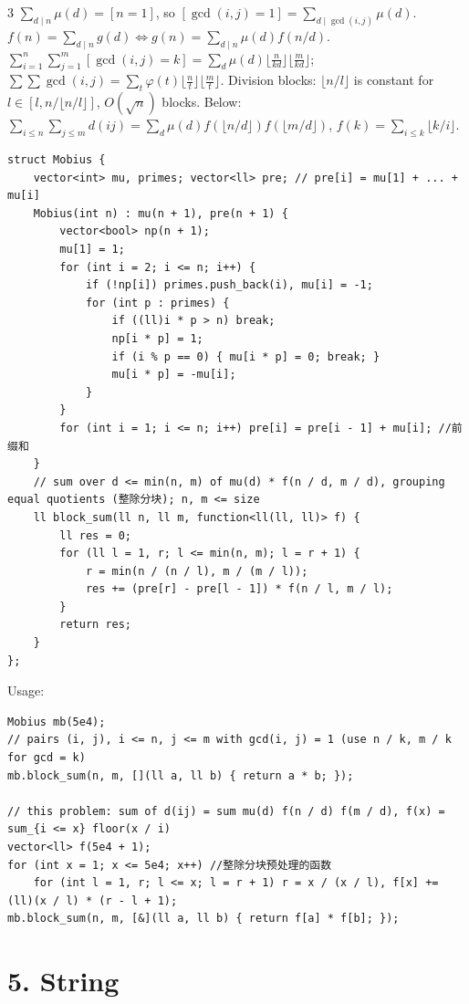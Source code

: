 \documentclass[8pt]{extarticle}
\begin{document}
\begin{multicols*}{3}
$\sum_{d \mid n}\mu(d) = [n = 1]$, so $[\gcd(i, j) = 1] = \sum_{d \mid \gcd(i,j)} \mu(d)$.
$f(n) = \sum_{d \mid n} g(d) \iff g(n) = \sum_{d \mid n} \mu(d) f(n/d)$.
$\sum_{i=1}^{n}\sum_{j=1}^{m}[\gcd(i,j) = k] = \sum_{d} \mu(d) \lfloor \frac{n}{kd} \rfloor \lfloor \frac{m}{kd} \rfloor$; $\sum\sum \gcd(i,j) = \sum_t \varphi(t) \lfloor \frac nt \rfloor \lfloor \frac mt \rfloor$.
Division blocks: $\lfloor n/l \rfloor$ is constant for $l \in [l, n / \lfloor n/l \rfloor]$, $O(\sqrt n)$ blocks. Below: $\sum_{i \le n}\sum_{j \le m} d(ij) = \sum_d \mu(d) f(\lfloor n/d \rfloor) f(\lfloor m/d \rfloor)$, $f(k) = \sum_{i \le k} \lfloor k/i \rfloor$.

\begin{lstlisting}
struct Mobius {
    vector<int> mu, primes; vector<ll> pre; // pre[i] = mu[1] + ... + mu[i]
    Mobius(int n) : mu(n + 1), pre(n + 1) {
        vector<bool> np(n + 1);
        mu[1] = 1;
        for (int i = 2; i <= n; i++) {
            if (!np[i]) primes.push_back(i), mu[i] = -1;
            for (int p : primes) {
                if ((ll)i * p > n) break;
                np[i * p] = 1;
                if (i % p == 0) { mu[i * p] = 0; break; }
                mu[i * p] = -mu[i];
            }
        }
        for (int i = 1; i <= n; i++) pre[i] = pre[i - 1] + mu[i]; //前缀和
    }
    // sum over d <= min(n, m) of mu(d) * f(n / d, m / d), grouping equal quotients (整除分块); n, m <= size
    ll block_sum(ll n, ll m, function<ll(ll, ll)> f) {
        ll res = 0;
        for (ll l = 1, r; l <= min(n, m); l = r + 1) {
            r = min(n / (n / l), m / (m / l));
            res += (pre[r] - pre[l - 1]) * f(n / l, m / l);
        }
        return res;
    }
};
\end{lstlisting}

Usage:

\begin{lstlisting}
Mobius mb(5e4);
// pairs (i, j), i <= n, j <= m with gcd(i, j) = 1 (use n / k, m / k for gcd = k)
mb.block_sum(n, m, [](ll a, ll b) { return a * b; });

// this problem: sum of d(ij) = sum mu(d) f(n / d) f(m / d), f(x) = sum_{i <= x} floor(x / i)
vector<ll> f(5e4 + 1);
for (int x = 1; x <= 5e4; x++) //整除分块预处理的函数
    for (int l = 1, r; l <= x; l = r + 1) r = x / (x / l), f[x] += (ll)(x / l) * (r - l + 1);
mb.block_sum(n, m, [&](ll a, ll b) { return f[a] * f[b]; });
\end{lstlisting}

\section*{5. String}


\end{multicols*}
\end{document}
